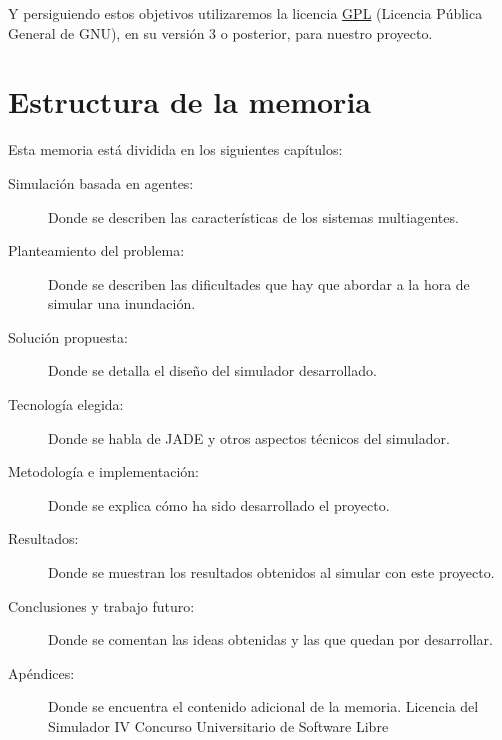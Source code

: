 Y persiguiendo estos objetivos utilizaremos la licencia \hyperref[ap1]{GPL}
(Licencia Pública General de GNU), en su versión 3 o posterior, para nuestro
proyecto.

\section*{Estructura de la memoria}

Esta memoria está dividida en los siguientes capítulos:

\begin{description}
 \item[Simulación basada en agentes:] Donde se describen las características de
los sistemas multiagentes.
 \item[Planteamiento del problema:] Donde se describen las dificultades que hay
que abordar a la hora de simular una inundación.
 \item[Solución propuesta:] Donde se detalla el diseño del simulador
desarrollado.
 \item[Tecnología elegida:] Donde se habla de JADE y otros aspectos
técnicos del simulador.
 \item[Metodología e implementación:] Donde se explica cómo ha sido desarrollado
el proyecto.
 \item[Resultados:] Donde se muestran los resultados obtenidos al simular con
este proyecto.
 \item[Conclusiones y trabajo futuro:] Donde se comentan las ideas obtenidas y
las que quedan por desarrollar.
 \item[Apéndices:] Donde se encuentra el contenido adicional de la memoria.
  \subitem Licencia del Simulador
  \subitem IV Concurso Universitario de Software Libre
\end{description}

